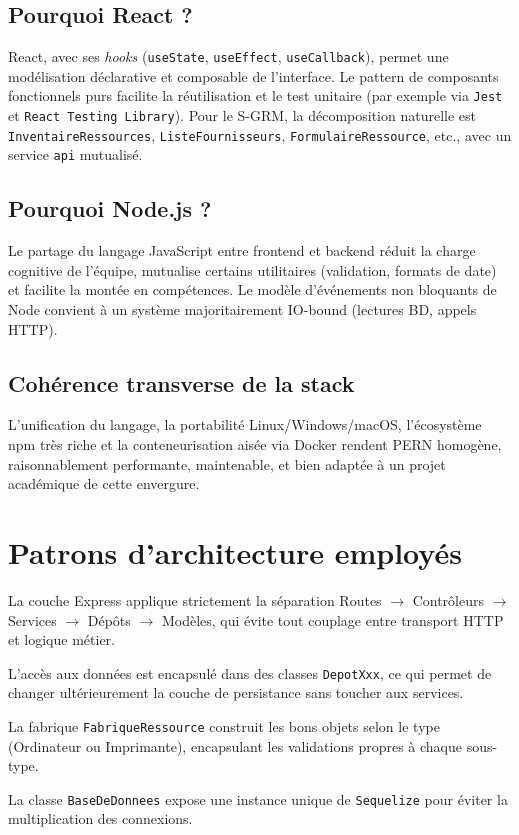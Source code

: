 \documentclass[a4paper,11pt,openany]{report}
\begin{document}
\subsection{Pourquoi React ?}

React, avec ses \emph{hooks} (\texttt{useState},
\texttt{useEffect}, \texttt{useCallback}), permet une
modélisation déclarative et composable de l'interface. Le pattern
de composants fonctionnels purs facilite la réutilisation et le
test unitaire (par exemple via \texttt{Jest} et \texttt{React
Testing Library}). Pour le S-GRM, la décomposition naturelle est
\texttt{InventaireRessources}, \texttt{ListeFournisseurs},
\texttt{FormulaireRessource}, etc., avec un service \texttt{api}
mutualisé.

\subsection{Pourquoi Node.js ?}

Le partage du langage JavaScript entre frontend et backend
réduit la charge cognitive de l'équipe, mutualise certains
utilitaires (validation, formats de date) et facilite la
montée en compétences. Le modèle d'événements non bloquants de
Node convient à un système majoritairement IO-bound (lectures
BD, appels HTTP).

\subsection{Cohérence transverse de la stack}

L'unification du langage, la portabilité Linux/Windows/macOS,
l'écosystème npm très riche et la conteneurisation aisée via
Docker rendent PERN homogène, raisonnablement performante,
maintenable, et bien adaptée à un projet académique de cette
envergure.

\section{Patrons d'architecture employés}

\begin{description}[leftmargin=*]
  \item[Modèle--Vue--Contrôleur (MVC).] La couche Express
    applique strictement la séparation Routes $\rightarrow$
    Contrôleurs $\rightarrow$ Services $\rightarrow$ Dépôts
    $\rightarrow$ Modèles, qui évite tout couplage entre
    transport HTTP et logique métier.
  \item[Repository.] L'accès aux données est encapsulé dans des
    classes \texttt{DepotXxx}, ce qui permet de changer
    ultérieurement la couche de persistance sans toucher aux
    services.
  \item[Factory Method.] La fabrique \texttt{FabriqueRessource}
    construit les bons objets selon le type (Ordinateur ou
    Imprimante), encapsulant les validations propres à chaque
    sous-type.
  \item[Singleton.] La classe \texttt{BaseDeDonnees} expose une
    instance unique de \texttt{Sequelize} pour éviter la
    multiplication des connexions.
\end{description}
\end{document}
